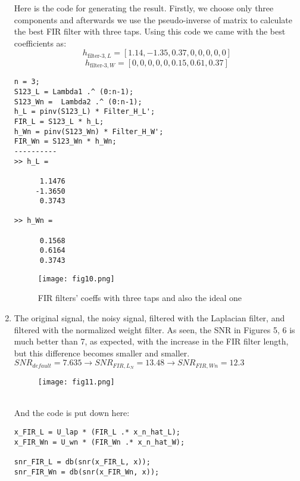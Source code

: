 \documentclass{article}
\begin{document}
\begin{enumerate}
    Here is the code for generating the result. Firstly, we choose only three components and afterwards we use the pseudo-inverse of matrix to calculate the best FIR filter with three taps. Using this code we came with the best coefficients as:
    \begin{equation*}
        h_{\text{filter-3},L} = [1.14, -1.35, 0.37, 0, 0 ,0 , 0, 0]
    \end{equation*}
    \begin{equation*}
        h_{\text{filter-3},W} = [0, 0, 0, 0, 0 ,0.15 , 0.61, 0.37]
    \end{equation*}
\begin{lstlisting}
n = 3; 
S123_L = Lambda1 .^ (0:n-1);
S123_Wn =  Lambda2 .^ (0:n-1);
h_L = pinv(S123_L) * Filter_H_L';
FIR_L = S123_L * h_L;
h_Wn = pinv(S123_Wn) * Filter_H_W';
FIR_Wn = S123_Wn * h_Wn;
----------
>> h_L =

      1.1476
     -1.3650
      0.3743

>> h_Wn =

      0.1568
      0.6164
      0.3743
\end{lstlisting}

\newpage

    \begin{figure}[h!]
        \centering
        \texttt{[image: fig10.png]} 
        \caption{FIR filters' coeffs with three taps and also the ideal one}
        \label{fig:gr7}
    \end{figure}

    \item 
    The original signal, the noisy signal, filtered with the Laplacian filter, and filtered with the normalized weight filter. As seen, the SNR in Figures 5, 6 is much better than 7, as expected, with the increase in the FIR filter length, but this difference becomes smaller and smaller.
    \\
    $SNR_{default} = 7.635 \xrightarrow{} SNR_{FIR,L_N} = 13.48 \xrightarrow{} SNR_{FIR,Wn} = 12.3 $\\
    \begin{figure}[h!]
        \centering
        \texttt{[image: fig11.png]} 
        \caption{}
        \label{fig:gr7}
    \end{figure}
    \\
    And the code is put down here:
\begin{lstlisting}
x_FIR_L = U_lap * (FIR_L .* x_n_hat_L);
x_FIR_Wn = U_wn * (FIR_Wn .* x_n_hat_W);

snr_FIR_L = db(snr(x_FIR_L, x));
snr_FIR_Wn = db(snr(x_FIR_Wn, x));

\end{lstlisting}
\end{enumerate}
\maketitle
\end{document}
